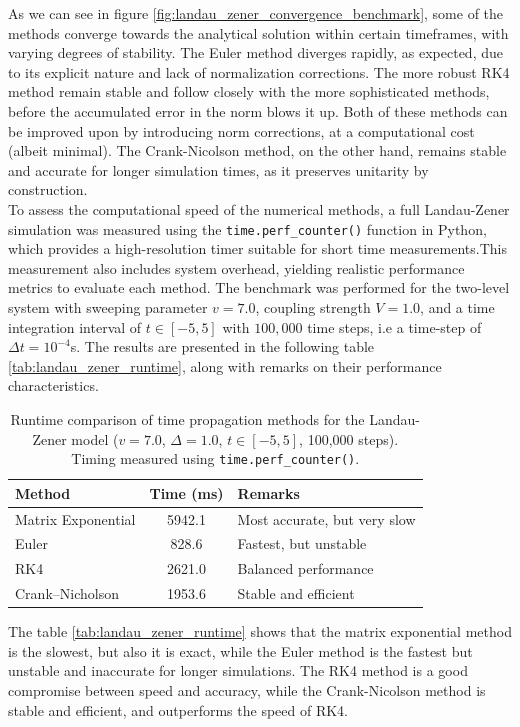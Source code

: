 \documentclass{subfiles}
\begin{document}
As we can see in figure \eqref{fig:landau_zener_convergence_benchmark}, some of the methods converge towards the analytical solution within certain timeframes, with varying degrees of stability. The Euler method diverges rapidly, as expected, due to its explicit nature and lack of normalization corrections. The more robust RK4 method remain stable and follow closely with the more sophisticated methods, before the accumulated error in the norm blows it up. Both of these methods can be improved upon by introducing norm corrections, at a computational cost (albeit minimal). The Crank-Nicolson method, on the other hand, remains stable and accurate for longer simulation times, as it preserves unitarity by construction. 
\\ 

To assess the computational speed of the numerical methods, a full Landau-Zener simulation was measured using the \texttt{time.perf\_counter()} function in Python, which provides a high-resolution timer suitable for short time measurements.This measurement also includes system overhead, yielding realistic performance metrics to evaluate each method. 
The benchmark was performed for the two-level system with sweeping parameter $v=7.0$, coupling strength $V=1.0$, and a time integration interval of $t \in [-5, 5]$ with $100{,}000$ time steps, i.e a time-step of $\Delta t = 10^{-4}$s. The results are presented in the following table \eqref{tab:landau_zener_runtime}, along with remarks on their performance characteristics.

\begin{table}[h!]
\centering
\caption{Runtime comparison of time propagation methods for the Landau-Zener model ($v = 7.0$, $\Delta = 1.0$, $t \in [-5, 5]$, 100,000 steps). Timing measured using \texttt{time.perf\_counter()}.}
\begin{tabular}{l c l}
\toprule
\textbf{Method} & \textbf{Time (ms)} & \textbf{Remarks} \\
\midrule
Matrix Exponential & 5942.1 & Most accurate, but very slow \\
Euler              & 828.6  & Fastest, but unstable \\
RK4                & 2621.0 & Balanced performance \\
Crank--Nicholson   & 1953.6 & Stable and efficient \\
\bottomrule
\end{tabular}\label{tab:landau_zener_runtime}
\end{table}
The table \eqref{tab:landau_zener_runtime} shows that the matrix exponential method is the slowest, but also it is exact, while the Euler method is the fastest but unstable and inaccurate for longer simulations. The RK4 method is a good compromise between speed and accuracy, while the Crank-Nicolson method is stable and efficient, and outperforms the speed of RK4. 
\end{document}
